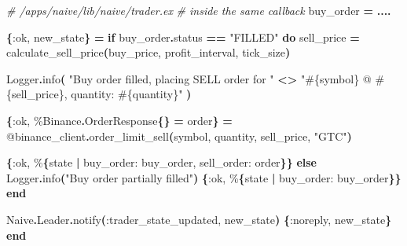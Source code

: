 \documentclass[
  oneside]{book}
\newenvironment{Shaded}{\begin{snugshade}}{\end{snugshade}}
\newcommand{\CommentTok}[1]{\textcolor[rgb]{0.56,0.35,0.01}{\textit{#1}}}
\newcommand{\ConstantTok}[1]{\textcolor[rgb]{0.56,0.35,0.01}{#1}}
\newcommand{\ControlFlowTok}[1]{\textcolor[rgb]{0.13,0.29,0.53}{\textbf{#1}}}
\newcommand{\FunctionTok}[1]{\textcolor[rgb]{0.13,0.29,0.53}{\textbf{#1}}}
\newcommand{\KeywordTok}[1]{\textcolor[rgb]{0.13,0.29,0.53}{\textbf{#1}}}
\newcommand{\NormalTok}[1]{#1}
\newcommand{\OperatorTok}[1]{\textcolor[rgb]{0.81,0.36,0.00}{\textbf{#1}}}
\newcommand{\OtherTok}[1]{\textcolor[rgb]{0.56,0.35,0.01}{#1}}
\newcommand{\StringTok}[1]{\textcolor[rgb]{0.31,0.60,0.02}{#1}}
\newcommand{\VariableTok}[1]{\textcolor[rgb]{0.00,0.00,0.00}{#1}}
\begin{document}
\begin{Shaded}
\begin{Highlighting}[]
  \CommentTok{\# /apps/naive/lib/naive/trader.ex}
  \CommentTok{\# inside the same callback}
\NormalTok{  buy\_order }\OperatorTok{=} \OperatorTok{....}

    \FunctionTok{\{}\VariableTok{:ok}\NormalTok{, new\_state}\FunctionTok{\}} \OperatorTok{=}
      \ControlFlowTok{if}\NormalTok{ buy\_order}\OperatorTok{.}\NormalTok{status }\OperatorTok{==} \StringTok{"FILLED"} \KeywordTok{do}
\NormalTok{        sell\_price }\OperatorTok{=}\NormalTok{ calculate\_sell\_price}\FunctionTok{(}\NormalTok{buy\_price, profit\_interval, tick\_size}\FunctionTok{)}

        \ConstantTok{Logger}\OperatorTok{.}\NormalTok{info}\FunctionTok{(}
          \StringTok{"Buy order filled, placing SELL order for "} \OperatorTok{\textless{}\textgreater{}}
            \StringTok{"}\OtherTok{\#\{}\NormalTok{symbol}\OtherTok{\}}\StringTok{ @ }\OtherTok{\#\{}\NormalTok{sell\_price}\OtherTok{\}}\StringTok{, quantity: }\OtherTok{\#\{}\NormalTok{quantity}\OtherTok{\}}\StringTok{"}
        \FunctionTok{)}

        \FunctionTok{\{}\VariableTok{:ok}\NormalTok{, \%}\ConstantTok{Binance}\OperatorTok{.}\ConstantTok{OrderResponse}\FunctionTok{\{\}} \OperatorTok{=}\NormalTok{ order}\FunctionTok{\}} \OperatorTok{=}
          \OtherTok{@binance\_client}\OperatorTok{.}\NormalTok{order\_limit\_sell}\FunctionTok{(}\NormalTok{symbol, quantity, sell\_price, }\StringTok{"GTC"}\FunctionTok{)}

        \FunctionTok{\{}\VariableTok{:ok}\NormalTok{, \%}\FunctionTok{\{}\NormalTok{state }\OperatorTok{|} \VariableTok{buy\_order:}\NormalTok{ buy\_order, }\VariableTok{sell\_order:}\NormalTok{ order}\FunctionTok{\}\}}
      \ControlFlowTok{else}
        \ConstantTok{Logger}\OperatorTok{.}\NormalTok{info}\FunctionTok{(}\StringTok{"Buy order partially filled"}\FunctionTok{)}
        \FunctionTok{\{}\VariableTok{:ok}\NormalTok{, \%}\FunctionTok{\{}\NormalTok{state }\OperatorTok{|} \VariableTok{buy\_order:}\NormalTok{ buy\_order}\FunctionTok{\}\}}
      \KeywordTok{end}

    \ConstantTok{Naive}\OperatorTok{.}\ConstantTok{Leader}\OperatorTok{.}\NormalTok{notify}\FunctionTok{(}\VariableTok{:trader\_state\_updated}\NormalTok{, new\_state}\FunctionTok{)}
    \FunctionTok{\{}\VariableTok{:noreply}\NormalTok{, new\_state}\FunctionTok{\}}
  \KeywordTok{end}
\end{Highlighting}
\end{Shaded}
\end{document}
